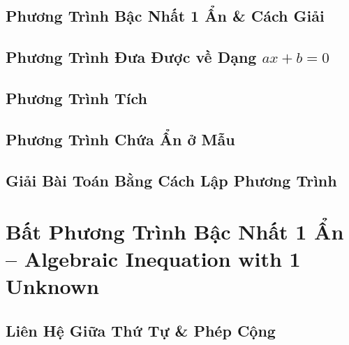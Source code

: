 \documentclass{article}
\numberwithin{equation}{section}
\begin{document}

\subsection{Phương Trình Bậc Nhất 1 Ẩn \& Cách Giải}


\subsection{Phương Trình Đưa Được về Dạng $ax + b = 0$}


\subsection{Phương Trình Tích}


\subsection{Phương Trình Chứa Ẩn ở Mẫu}


\subsection{Giải Bài Toán Bằng Cách Lập Phương Trình}


\section{Bất Phương Trình Bậc Nhất 1 Ẩn -- Algebraic Inequation with 1 Unknown}

\subsection{Liên Hệ Giữa Thứ Tự \& Phép Cộng}

\end{document}
